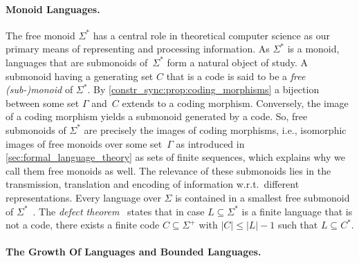 

\paragraph{Monoid Languages.} The free monoid $\Sigma^*$ has a central role in theoretical computer science
as our primary means of representing and processing information. As $\Sigma^*$ is a monoid, languages
that are submonoids of~$\Sigma^*$ form a natural object of study. A submonoid
having a generating set $C$ that is a code is said to be a \emph{free \mbox{(sub-)}monoid} of $\Sigma^*$. 
By \cref{constr_sync:prop:coding_morphisms} a bijection between some set $\Gamma$
and~$C$ extends to a coding morphism.
Conversely, the image of a coding morphism
yields a submonoid generated by a code. So, free submonoids of $\Sigma^*$
are precisely the images of coding morphisms, i.e., isomorphic
images of free monoids over some set~$\Gamma$ as
introduced in \cref{sec:formal_language_theory} as sets of finite sequences,
which explains why we call them free monoids as well.
The relevance of these submonoids lies in the transmission, translation and encoding of information w.r.t.~different representations.
Every language over $\Sigma$
is contained in a smallest free submonoid of $\Sigma^*$~\cite{lothaire_1997}.
The \emph{defect theorem}~\cite[Thm. 1.2.5]{lothaire_1997}
states that in case $L \subseteq \Sigma^*$ is a finite language that is not a code,
there exists a finite code $C \subseteq \Sigma^+$
with $|C| \le |L| - 1$ such that $L \subseteq C^*$.


 
\paragraph{The Growth Of Languages and Bounded Languages.}


